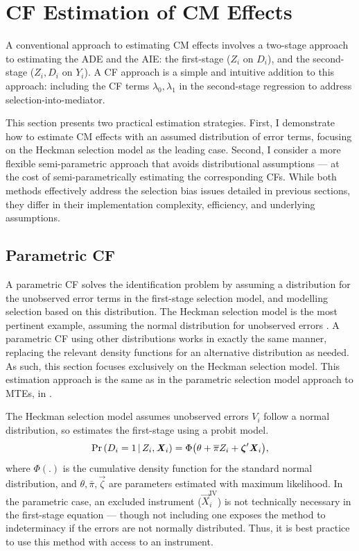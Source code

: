 \section{CF Estimation of CM Effects}
\label{sec:controlfun}
A conventional approach to estimating CM effects involves a two-stage approach to estimating the ADE and the AIE: the first-stage ($Z_i$ on $D_i$), and the second-stage ($Z_i, D_i$ on $Y_i$).
A CF approach is a simple and intuitive addition to this approach: including the CF terms $\lambda_0, \lambda_1$ in the second-stage regression to address selection-into-mediator.

This section presents two practical estimation strategies.
First, I demonstrate how to estimate CM effects with an assumed distribution of error terms, focusing on the Heckman selection model as the leading case.
Second, I consider a more flexible semi-parametric approach that avoids distributional assumptions --- at the cost of semi-parametrically estimating the corresponding CFs.
While both methods effectively address the selection bias issues detailed in previous sections, they differ in their implementation complexity, efficiency, and underlying assumptions.

\subsection{Parametric CF}
A parametric CF solves the identification problem by assuming a distribution for the unobserved error terms in the first-stage selection model, and modelling selection based on this distribution.
The Heckman selection model is the most pertinent example, assuming the normal distribution for unobserved errors \citep{heckman1979sample}.
A parametric CF using other distributions works in exactly the same manner, replacing the relevant density functions for an alternative distribution as needed.
As such, this section focuses exclusively on the Heckman selection model.
This estimation approach is the same as in the parametric selection model approach to MTEs, in \cite{bjorklund1987estimation}.

The Heckman selection model assumes unobserved errors $V_i$ follow a normal distribution, so estimates the first-stage using a probit model.
\[ \Pr\left( D_i = 1 \, \middle\vert \, Z_i, \boldsymbol{\mathit{X}}_i \right)
    = \Phi \big( \theta + \overline{\pi} Z_i + \boldsymbol{\mathit{\zeta}}' \boldsymbol{\mathit{X}}_i \big), \]
where $\Phi(.)$ is the cumulative density function for the standard normal distribution, and $\theta, \bar\pi, \vec\zeta$ are parameters estimated with maximum likelihood.
In the parametric case, an excluded instrument ($\vec X_i^{\text{IV}}$) is not technically necessary in the first-stage equation --- though not including one exposes the method to indeterminacy if the errors are not normally distributed.
Thus, it is best practice to use this method with access to an instrument.

